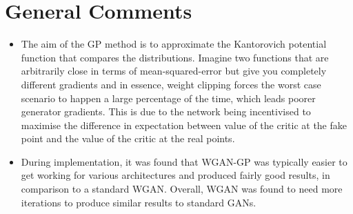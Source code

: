 \documentclass{article}
\begin{document}
\section{General Comments}
\begin{itemize}
	\item The aim of the GP method is to approximate the Kantorovich potential function that compares the distributions. Imagine two functions that are arbitrarily close in terms of mean-squared-error but give you completely different gradients and in essence, weight clipping forces the worst case scenario to happen a large percentage of the time, which leads poorer generator gradients. This is due to the network being incentivised to maximise the difference in expectation between value of the critic at the fake point and the value of the critic at the real points.  
	\item During implementation, it was found that WGAN-GP was typically easier to get working for various architectures and produced fairly good results, in comparison to a standard WGAN. Overall, WGAN was found to need more iterations to produce similar results to standard GANs. 
\end{itemize}
\end{document}
